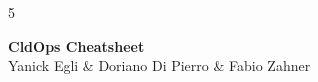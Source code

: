 \documentclass[9pt,landscape,a4paper]{extarticle}
\begin{document}
\graphicspath{ {./media/} }
\begin{multicols}{5}
	\begin{center}
		{\bfseries\sffamily\large CldOps Cheatsheet}\\
		{\sffamily\small Yanick Egli \& Doriano Di Pierro \& Fabio Zahner}
	\end{center}
	
	
	
	
	
	
	
	
	
	
	
	
\end{multicols}
\label{LastPage}
\end{document}
